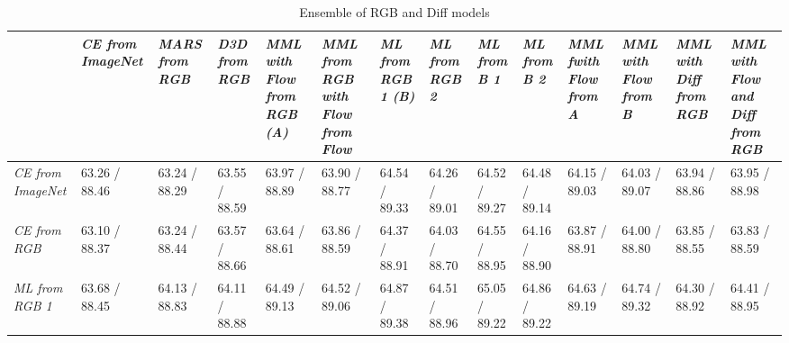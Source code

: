 \documentclass[conference]{IEEEtran}
\begin{document}
\begin{table*}[!h]
	\centering
	\caption{Ensemble of RGB and Diff models}
	\label{tab:rgbdiff}
	\centering
	\begin{tabular}{|p{}|p{}|p{}|p{}|p{}|p{}|p{}|p{}|p{}|p{}|p{}|p{}|p{}|p{}|}
		\hline \diagbox[innerwidth=0.06\textwidth]{Diff}{RGB} & \it CE from ImageNet & \it MARS from RGB & \it D3D from RGB & \it MML with Flow from RGB (\textbf{A}) & \it MML from RGB with Flow from Flow & \it ML from RGB 1 (\textbf{B}) & \it ML from RGB 2 & \it ML from \textbf{B} 1 & \it ML from \textbf{B} 2 & \it MML fwith Flow from \textbf{A} & \it MML with Flow from \textbf{B} & \it MML with Diff from RGB & \it MML with Flow and Diff from RGB \\ \hline
		\it CE from ImageNet & \cellcolor[RGB]{182,210,236} 63.26 / 88.46 & \cellcolor[RGB]{178,208,235} 63.24 / 88.29 & \cellcolor[RGB]{234,242,250} 63.55 / 88.59 & \cellcolor[RGB]{255,218,218} 63.97 / 88.89 & \cellcolor[RGB]{255,226,226} 63.90 / 88.77 & \cellcolor[RGB]{255,147,147} 64.54 / 89.33 & \cellcolor[RGB]{255,182,182} 64.26 / 89.01 & \cellcolor[RGB]{255,150,150} 64.52 / 89.27 & \cellcolor[RGB]{255,154,154} 64.48 / 89.14 & \cellcolor[RGB]{255,195,195} 64.15 / 89.03 & \cellcolor[RGB]{255,210,210} 64.03 / 89.07 & \cellcolor[RGB]{255,221,221} 63.94 / 88.86 & \cellcolor[RGB]{255,220,220} 63.95 / 88.98 \\ \hline 
		\it CE from RGB & \cellcolor[RGB]{153,193,229} 63.10 / 88.37 & \cellcolor[RGB]{178,208,235} 63.24 / 88.44 & \cellcolor[RGB]{237,244,250} 63.57 / 88.66 & \cellcolor[RGB]{250,252,254} 63.64 / 88.61 & \cellcolor[RGB]{255,231,231} 63.86 / 88.59 & \cellcolor[RGB]{255,168,168} 64.37 / 88.91 & \cellcolor[RGB]{255,210,210} 64.03 / 88.70 & \cellcolor[RGB]{255,146,146} 64.55 / 88.95 & \cellcolor[RGB]{255,194,194} 64.16 / 88.90 & \cellcolor[RGB]{255,230,230} 63.87 / 88.91 & \cellcolor[RGB]{255,214,214} 64.00 / 88.80 & \cellcolor[RGB]{255,233,233} 63.85 / 88.55 & \cellcolor[RGB]{255,235,235} 63.83 / 88.59 \\ \hline 
		\it ML from RGB 1 & \cellcolor[RGB]{255,254,254} 63.68 / 88.45 & \cellcolor[RGB]{255,198,198} 64.13 / 88.83 & \cellcolor[RGB]{255,200,200} 64.11 / 88.88 & \cellcolor[RGB]{255,153,153} 64.49 / 89.13 & \cellcolor[RGB]{255,150,150} 64.52 / 89.06 & \cellcolor[RGB]{255,106,106} 64.87 / 89.38 & \cellcolor[RGB]{255,151,151} 64.51 / 88.96 & \cellcolor[RGB]{255,84,84} 65.05 / 89.22 & \cellcolor[RGB]{255,107,107} 64.86 / 89.22 & \cellcolor[RGB]{255,136,136} 64.63 / 89.19 & \cellcolor[RGB]{255,122,122} 64.74 / 89.32 & \cellcolor[RGB]{255,177,177} 64.30 / 88.92 & \cellcolor[RGB]{255,163,163} 64.41 / 88.95 \\ \hline 

\end{tabular}
\end{table*}
\end{document}

